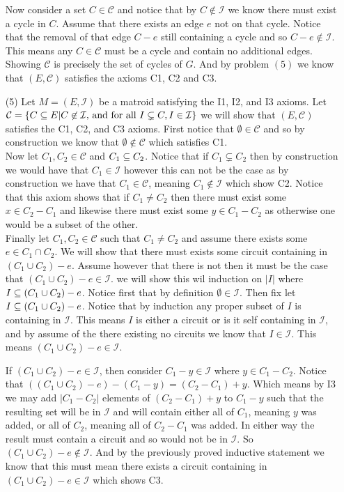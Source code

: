 \documentclass[12pt]{amsart}
\begin{document}
\begin{itemize}
Now consider a set $C\in\mathcal{C}$ and notice that by $C\not\in\mathcal{I}$ we know there must exist a cycle in $C$. Assume that there exists an edge $e$ not on that cycle. Notice that the removal of that edge $C-e$ still containing a cycle and so $C-e\not\in\mathcal{I}$. This means any $C\in\mathcal{C}$ must be a cycle and contain no additional edges. Showing $\mathcal{C}$ is precisely the set of cycles of $G$. And by problem $(5)$ we know that $(E,\mathcal{C})$ satisfies the axioms C1, C2 and C3.\\

\item[(5)] %
Let $M=(E,\mathcal{I})$ be a matroid satisfying the I1, I2,  and I3 axioms. Let $\mathcal{C}=\{C\subseteq E | C\not\in \mathcal{I}\text{, and for all }I\subsetneq C, I\in\mathcal{I}\}$ we will show that $(E,\mathcal{C})$ satisfies the C1, C2, and C3 axioms. First notice that $\emptyset\in \mathcal{C}$ and so by construction we know that $\emptyset\not\in \mathcal{C}$ which satisfies C1.\\

Now let $C_1,C_2\in\mathcal{C}$ and $C_1\subseteq C_2$. Notice that if $C_1\subsetneq C_2$ then by construction we would have that $C_1\in \mathcal{I}$ however this can not be the case as by construction we have that $C_1\in\mathcal{C}$, meaning $C_1\not\in\mathcal{I}$ which show C2. Notice that this axiom shows that if $C_1\neq C_2$ then there must exist some $x\in C_2-C_1$ and likewise there must exist some $y\in C_1-C_2$ as otherwise one would be a subset of the other.\\

Finally let $C_1,C_2\in\mathcal{C}$ such that $C_1\neq C_2$ and assume there exists some $e\in C_1\cap C_2$. We will show that there must exists some circuit containing in $(C_1\cup C_2)-e$. Assume however that there is not then it must be the case that $(C_1\cup C_2)-e\in \mathcal{I}$. we will show this wil induction on $|I|$ where $I\subseteq (C_1\cup C_2)-e$. Notice first that by definition $\emptyset\in\mathcal{I}$. Then fix let $I\subseteq (C_1\cup C_2)-e$. Notice that by induction any proper subset of $I$ is containing in $\mathcal{I}$. This means $I$ is either a circuit or is it self containing in $\mathcal{I}$, and by assume of the there existing no circuits we know that $I\in \mathcal{I}$. This means $(C_1\cup C_2)-e\in \mathcal{I}$.

If $(C_1\cup C_2)-e\in \mathcal{I}$, then consider $C_1-y\in\mathcal{I}$ where $y\in C_1-C_2$. Notice that $((C_1\cup C_2)-e)-(C_1-y)=(C_2-C_1)+y$. Which means by I3 we may add $|C_1-C_2|$ elements of $(C_2-C_1)+y$ to $C_1-y$ such that the resulting set will be in $\mathcal{I}$ and will contain either all of $C_1$, meaning $y$ was added, or all of $C_2$, meaning all of $C_2-C_1$ was added. In either way the result must contain a circuit and so would not be in $\mathcal{I}$. So $(C_1\cup C_2)-e\not\in \mathcal{I}$. And by the previously proved inductive statement we know that this must mean there exists a circuit containing in $(C_1\cup C_2)-e\in \mathcal{I}$ which shows C3.\\


\end{itemize}
\end{document}
